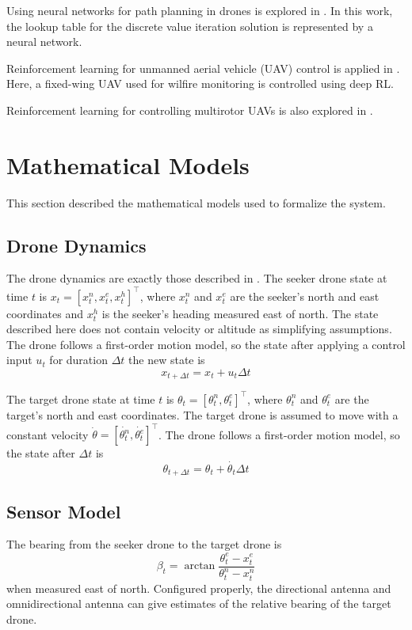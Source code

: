 \documentclass[10pt,twocolumn,letterpaper]{article}
\begin{document}
Using neural networks for path planning in drones is explored in \cite{kyle2}.
In this work, the lookup table for the discrete value iteration solution is represented by a neural network.

Reinforcement learning for unmanned aerial vehicle (UAV) control is applied in \cite{kyle1}.
Here, a fixed-wing UAV used for wilfire monitoring is controlled using deep RL.

Reinforcement learning for controlling multirotor UAVs is also explored in \cite{learning_to_seek}.

\section{Mathematical Models}
\label{sec:models}
This section described the mathematical models used to formalize the system.

\subsection{Drone Dynamics}
The drone dynamics are exactly those described in \cite{dronehunter}.
The seeker drone state at time $t$ is $x_t = [x_t^n, x_t^e, x_t^h]^\intercal$, where $x_t^n$ and $x_t^e$ are the seeker's north and east coordinates and $x_t^h$ is the seeker's heading measured east of north.
The state described here does not contain velocity or altitude as simplifying assumptions.
The drone follows a first-order motion model, so the state after applying a control input $u_t$ for duration $\Delta t$ the new state is
\begin{equation}
x_{t + \Delta t} = x_t + u_t\Delta t
\end{equation}

The target drone state at time $t$ is $\theta_t = [\theta_t^n, \theta_t^e]^\intercal$, where $\theta_t^n$ and $\theta_t^e$ are the target's north and east coordinates.
The target drone is assumed to move with a constant velocity $\dot{\theta} = [\dot{\theta_t^n}, \dot{\theta_t^e}]^\intercal$.
The drone follows a first-order motion model, so the state after $\Delta t$ is
\begin{equation}
\theta_{t + \Delta t} = \theta_t + \dot{\theta_t}\Delta t
\label{target_dynamics}
\end{equation}

\subsection{Sensor Model}
The bearing from the seeker drone to the target drone is 
\begin{equation}
\beta_t = \arctan{\frac{\theta_t^e - x_t^e}{\theta_t^n - x_t^n}}
\end{equation}
when measured east of north.
Configured properly, the directional antenna and omnidirectional antenna can give estimates of the relative bearing of the target drone.
\end{document}
